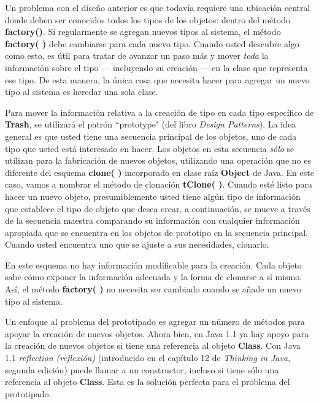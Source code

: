 Un problema con el diseño anterior es que todavía requiere una ubicación central donde deben ser conocidos todos los tipos de los objetos: dentro del método \textbf{factory()}. Si regularmente se agregan nuevos tipos al sistema, el método \textbf{factory( )} debe cambiarse para cada nuevo tipo. Cuando usted descubre algo como esto, es útil para tratar de avanzar un paso más y mover \textit{toda} la información sobre el tipo — incluyendo su creación — en la clase que representa ese tipo. De esta manera, la única cosa que necesita hacer para agregar un nuevo tipo al sistema es heredar una sola clase.   \newline

Para mover la información relativa a la creación de tipo en cada tipo específico de \textbf{Trash}, se utilizará el patrón “prototype" (del libro \textit{Design Patterns}). La idea general es que usted tiene una secuencia principal de los objetos, uno de cada tipo que usted está interesado en hacer. Los objetos en esta secuencia \textit{sólo} se utilizan para la fabricación de nuevos objetos, utilizando una operación que no es diferente del esquema \textbf{clone( )} incorporado en clase raíz \textbf{Object} de Java. En este caso, vamos a nombrar el método de clonación \textbf{tClone( )}. Cuando esté listo para hacer un nuevo objeto, presumiblemente usted tiene algún tipo de información que establece el tipo de objeto que desea crear, a continuación, se mueve a través de la secuencia maestra comparando su información con cualquier información apropiada que se encuentra en los objetos de prototipo en la secuencia principal. Cuando usted encuentra uno que se ajuste a sus necesidades, clonarlo.    \newline

En este esquema no hay información modificable para la creación. Cada objeto sabe cómo exponer la información adecuada y la forma de clonarse a sí mismo. Así, el método \textbf{factory( )} no necesita ser cambiado cuando se añade un nuevo tipo al sistema.     \newline

Un enfoque al problema del prototipado es agregar un número de métodos para apoyar la creación de nuevos objetos. Ahora bien, en Java 1.1 ya hay apoyo para la creación de nuevos objetos si tiene una referencia al objeto \textbf{Class}. Con Java 1.1 \textit{reflection (reflexión)} (introducido en el capítulo 12 de \textit{Thinking in Java}, segunda edición) puede llamar a un constructor, incluso si tiene sólo una referencia al objeto \textbf{Class}. Esta es la solución perfecta para el problema del prototipado.   \newline

